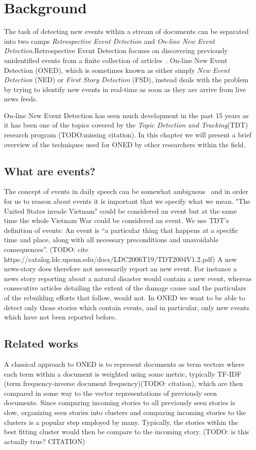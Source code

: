 \chapter{Background}
\label{chapter:background}

The task of detecting new events within a stream of documents can be separated into two camps \emph{Retrospective Event Detection} and \emph{On-line New Event Detection}.Retrospective Event Detection focuses on discovering previously unidentified events from a finite collection of articles~\cite{yang1998study}. On-line New Event Detection (ONED), which is sometimes known as either simply \emph{New Event Detection} (NED) or \emph{First Story Detection} (FSD), instead deals with the problem by trying to identify new events in real-time as soon as they are arrive from live news feeds.

On-line New Event Detection has seen much development in the past 15 years as it has been one of the topics covered by the \emph{Topic Detection and Tracking}(TDT) research program (TODO:missing citation). In this chapter we will present a brief overview of the techniques used for ONED by other researchers within the field.

\section{What are events?}
The concept of events in daily speech can be somewhat ambiguous~\cite{papka1999online} and in order for us to reason about events it is important that we specify what we mean. "The United States invade Vietnam" could be considered an event but at the same time the whole Vietnam War could be considered an event. We use TDT's definition of events: An event is ``a particular thing that happens at a specific time and place, along with all necessary preconditions and unavoidable consequences''. (TODO: cite https://catalog.ldc.upenn.edu/docs/LDC2006T19/TDT2004V1.2.pdf)
A new news-story does therefore not necessarily report an new event. For instance a news story reporting about a natural disaster would contain a new event, whereas consecutive articles detailing the extent of the damage cause and the particulars of the rebuilding efforts that follow, would not. In ONED we want to be able to detect only those stories which contain events, and in particular, only new events which have not been reported before.

\section{Related works}
A classical approach to ONED is to represent documents as term vectors where each term within a document is weighted using some metric, typically TF-IDF (term frequency-inverse document frequency)(TODO: citation), which are then compared in some way to the vector representations of previously seen documents. Since comparing incoming stories to all previously seen stories is slow, organizing seen stories into clusters and comparing incoming stories to the clusters is a popular step employed by many. Typically, the stories within the best fitting cluster would then be compare to the incoming story. (TODO: is this actually true? CITATION)

